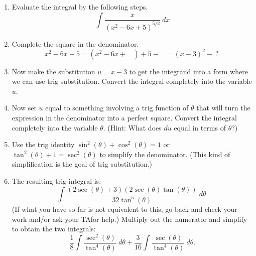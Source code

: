 \documentclass[12pt]{article}
\begin{document}
\begin{enumerate}

\item Evaluate the integral by the following steps.
\[\displaystyle\int  \frac{x}{(x^2-6x+5)^{5/2}} \ dx\]
\item Complete the square in the denominator.
\[x^2-6x+5 =(x^2-6x+\underline{~~~} \ )+5-\underline{~~~}=(x-3)^2-\underline{~?~}
\]

\vspace{1cm}
\item Now make the substitution $u=x-3$ to get the integrand into a form where we can use trig substitution. Convert the integral completely into the variable $u$.

\vspace{1.25in}

\item Now set $u$ equal to something involving a trig function of $\theta$ that will turn the expression in the denominator into a perfect square.
Convert the integral completely into the variable $\theta$. (Hint: What does $du$ equal in terms of $\theta$?) 

\vspace{1.25in}
\item Use the trig identity $\sin^2(\theta) + \cos^2(\theta) = 1$ or $\tan^2(\theta)+1=\sec^2(\theta)$ to simplify the denominator. (This kind of simplification is the goal of trig substitution.)

\vspace{2in}

\item The resulting trig integral is: \[\displaystyle\int  \frac{(2\sec(\theta)+3)(2\sec(\theta)\tan(\theta))}{32\tan^5(\theta)} \ d\theta.\] (If what you have so far is not equivalent to this, go back and check your work and/or ask your TAfor help.) Multiply out the numerator and simplify to obtain the two integrals: \[\displaystyle\frac{1}{8}\displaystyle\int  \frac{\sec^2(\theta)}{\tan^4(\theta)} \ d\theta + \frac{3}{16}\displaystyle\int\frac{\sec(\theta)}{\tan^4(\theta)} \ d\theta.\]


\end{enumerate}
\end{document}
